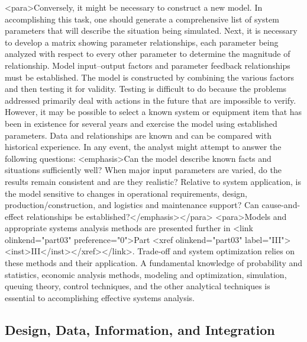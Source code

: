 <para>Conversely, it might be necessary to construct a new model. In accomplishing this task, one should generate a comprehensive list of system parameters that will describe the situation being simulated. Next, it is necessary to develop a matrix showing parameter relationships, each parameter being analyzed with respect to every other parameter to determine the magnitude of relationship. Model input–output factors and parameter feedback relationships must be established. The model is constructed by combining the various factors and then testing it for validity. Testing is difficult to do because the problems addressed primarily deal with actions in the future that are impossible to verify. However, it may be possible to select a known system or equipment item that has been in existence for several years and exercise the model using established parameters. Data and relationships are known and can be compared with historical experience. In any event, the analyst might attempt to answer the following questions: <emphasis>Can the model describe known facts and situations sufficiently well? When major input parameters are varied, do the results remain consistent and are they realistic? Relative to system application, is the model sensitive to changes in operational requirements, design, production/construction, and logistics and maintenance support? Can cause-and-effect relationships be established?</emphasis></para>
<para>Models and appropriate systems analysis methods are presented further in <link olinkend="part03" preference="0">Part <xref olinkend="part03" label="III"><inst>III</inst></xref></link>. Trade-off and system optimization relies on these methods and their application. A fundamental knowledge of probability and statistics, economic analysis methods, modeling and optimization, simulation, queuing theory, control techniques, and the other analytical techniques is essential to accomplishing effective systems analysis.

\subsection{Design, Data, Information, and Integration}

